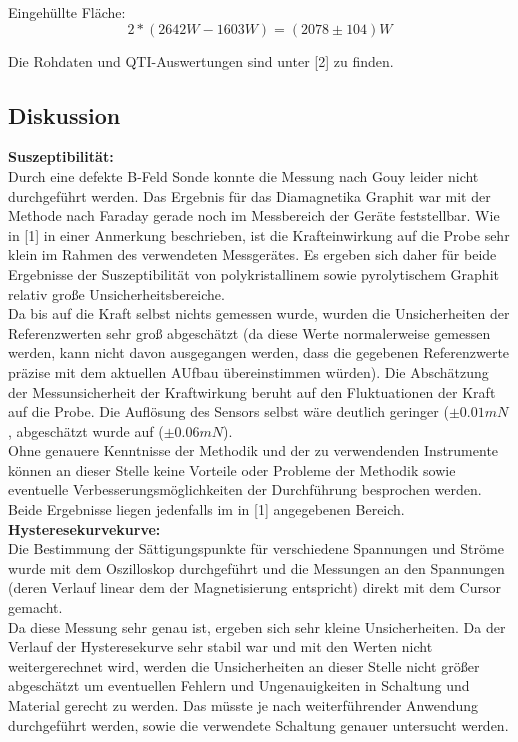 \documentclass[12pt,a4paper]{article}
\begin{document}
\begin{multicols}{2}



Eingehüllte Fläche: 
$$2 * (2642W - 1603W) = (2078 \pm 104)W$$

\noindent
Die Rohdaten und QTI-Auswertungen sind unter [2] zu finden.

\subsection{Diskussion}
\textbf{Suszeptibilität:}\\
Durch eine defekte B-Feld Sonde konnte die Messung nach Gouy leider nicht durchgeführt werden. Das Ergebnis für das Diamagnetika Graphit war mit der Methode nach Faraday gerade noch im Messbereich der Geräte feststellbar. Wie in [1] in einer Anmerkung beschrieben, ist die Krafteinwirkung auf die Probe sehr klein im Rahmen des verwendeten Messgerätes. Es ergeben sich daher für beide Ergebnisse der Suszeptibilität  von polykristallinem sowie pyrolytischem Graphit relativ große Unsicherheitsbereiche.\\
Da bis auf die Kraft selbst nichts gemessen wurde, wurden die Unsicherheiten der Referenzwerten sehr groß abgeschätzt (da diese Werte normalerweise gemessen werden, kann nicht davon ausgegangen werden, dass die gegebenen Referenzwerte präzise mit dem aktuellen AUfbau übereinstimmen würden). Die Abschätzung der Messunsicherheit der Kraftwirkung beruht auf den Fluktuationen der Kraft auf die Probe. Die Auflösung des Sensors selbst wäre deutlich geringer ($\pm 0.01mN$, abgeschätzt wurde auf ($\pm 0.06mN$).\\
Ohne genauere Kenntnisse der Methodik und der zu verwendenden Instrumente können an dieser Stelle keine Vorteile oder Probleme der Methodik sowie eventuelle Verbesserungsmöglichkeiten der Durchführung besprochen werden.\\
Beide Ergebnisse liegen jedenfalls im in [1] angegebenen Bereich.\\


\noindent \textbf{Hysteresekurvekurve:}\\
Die Bestimmung der Sättigungspunkte für verschiedene Spannungen und Ströme wurde mit dem Oszilloskop durchgeführt und die Messungen an den Spannungen (deren Verlauf linear dem der Magnetisierung entspricht) direkt mit dem Cursor gemacht.\\
Da diese Messung sehr genau ist, ergeben sich sehr kleine Unsicherheiten. Da der Verlauf der Hysteresekurve sehr stabil war und mit den Werten nicht weitergerechnet wird, werden die Unsicherheiten an dieser Stelle nicht größer abgeschätzt um eventuellen Fehlern und Ungenauigkeiten in Schaltung und Material gerecht zu werden. Das müsste je nach weiterführender Anwendung durchgeführt werden, sowie die verwendete Schaltung genauer untersucht werden.\\


\end{multicols}
\end{document}

